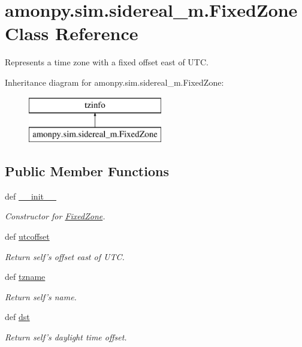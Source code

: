 \hypertarget{classamonpy_1_1sim_1_1sidereal__m_1_1_fixed_zone}{\section{amonpy.\-sim.\-sidereal\-\_\-m.\-Fixed\-Zone Class Reference}
\label{classamonpy_1_1sim_1_1sidereal__m_1_1_fixed_zone}
}


Represents a time zone with a fixed offset east of U\-T\-C.  


Inheritance diagram for amonpy.\-sim.\-sidereal\-\_\-m.\-Fixed\-Zone\-:\begin{figure}[H]
\begin{center}
\leavevmode
\includegraphics[height=2.000000cm]{d4/d37/classamonpy_1_1sim_1_1sidereal__m_1_1_fixed_zone}
\end{center}
\end{figure}
\subsection*{Public Member Functions}
\begin{DoxyCompactItemize}
\item 
def \hyperlink{classamonpy_1_1sim_1_1sidereal__m_1_1_fixed_zone_a0e29cd625591a8a1bad0c567ad775898}{\-\_\-\-\_\-init\-\_\-\-\_\-}
\begin{DoxyCompactList}\small\item\em Constructor for \hyperlink{classamonpy_1_1sim_1_1sidereal__m_1_1_fixed_zone}{Fixed\-Zone}. \end{DoxyCompactList}\item 
def \hyperlink{classamonpy_1_1sim_1_1sidereal__m_1_1_fixed_zone_a747541b59e840bcfdf7df8805f9b1179}{utcoffset}
\begin{DoxyCompactList}\small\item\em Return self's offset east of U\-T\-C. \end{DoxyCompactList}\item 
def \hyperlink{classamonpy_1_1sim_1_1sidereal__m_1_1_fixed_zone_ae3a652035c1a0d2ed33028e1e647c72b}{tzname}
\begin{DoxyCompactList}\small\item\em Return self's name. \end{DoxyCompactList}\item 
def \hyperlink{classamonpy_1_1sim_1_1sidereal__m_1_1_fixed_zone_a7f7ae1103d0ccbbc698e595925329b8f}{dst}
\begin{DoxyCompactList}\small\item\em Return self's daylight time offset. \end{DoxyCompactList}\end{DoxyCompactItemize}



